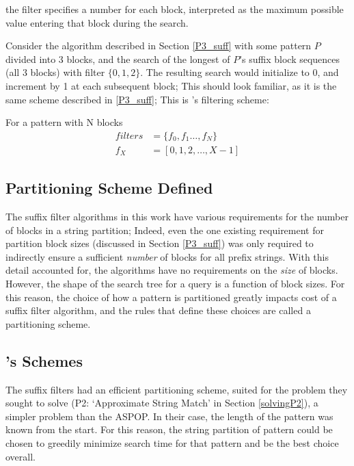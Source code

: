 {the filter specifies a number for each block, interpreted as the maximum possible  value entering that block during the search.
 
Consider the algorithm described in Section \ref{P3_suff} with some pattern $P$ divided into 3 blocks, and the search of the longest of $P$’s \glspl{suffix block sequence} (all 3 blocks) with filter $\{0, 1, 2\}$. The resulting search would initialize  to 0, and increment  by 1 at each subsequent block; This should look familiar, as it is the same scheme described in \ref{P3_suff}; This is \kark{}'s filtering scheme:

\begin{fscheme}
\textup{For a pattern with N blocks}
\label{karkfilters}
\begin{align*}
filters &= \{f_0, f_1\ldots{} , f_N\}\\
f_X &= [0, 1, 2,\ldots , X-1]
\end{align*}
\end{fscheme}


\subsection{Partitioning Scheme Defined}
The \gls{suffix filter} algorithms in this work have various requirements for the number of \glspl{block} in a \gls{string partition}; Indeed, even the one existing requirement for partition block sizes (discussed in Section \ref{P3_suff}) was only required to indirectly ensure a sufficient \textit{number} of blocks for all prefix strings. With this detail accounted for, the algorithms have no requirements on the \textit{size} of blocks. However, the shape of the search tree for a \gls{query} is a function of block sizes. For this reason, the choice of how a \gls{pattern} is partitioned greatly impacts cost of a suffix filter algorithm, and the rules that define these choices are called a \gls{partitioning scheme}.




\subsection{\kark{}'s Schemes}
\label{schemes:kark}

The \kark{} \glspl{suffix filter} had an efficient \gls{partitioning scheme}, suited for the problem they sought to solve (P2: `Approximate String Match' in Section \ref{solvingP2}), a simpler problem than the ASPOP. In their case, the length of the \gls{pattern} was known from the start. For this reason, the \gls{string partition} of pattern could be chosen to greedily minimize search time for that pattern and be the best choice overall.

}
